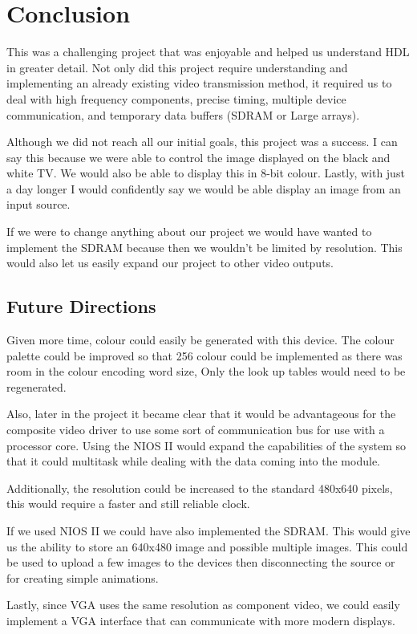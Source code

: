 \section{Conclusion}
This was a challenging project that was enjoyable and helped us understand HDL
in greater detail. Not only did this project require understanding and 
implementing an already existing video transmission method, it required us 
to deal with high frequency components, precise timing, multiple device 
communication, and temporary data buffers (SDRAM or Large arrays).

Although we did not reach all our initial goals, this project was a success. 
I can say this because we were able to control the image displayed on the black
and white TV. We would also be able to display this in 8-bit colour. Lastly, 
with just a day longer I would confidently say we would be able display an 
image from an input source.

If we were to change anything about our project we would have wanted to implement
the SDRAM because then we wouldn't be limited by resolution. This would also
let us easily expand our project to other video outputs.

\newpage

\subsection{Future Directions}

Given more time, colour could easily be generated with this device. The colour
palette could be improved so that 256 colour could be implemented as there was
room in the colour encoding word size, Only the look up tables would need to be
regenerated. 

Also, later in the project it became clear that it would be advantageous for the
composite video driver to use some sort of communication bus for use with a
processor core. Using the NIOS II would expand the capabilities of the system so
that it could multitask while dealing with the data coming into the module.

Additionally, the resolution could be increased to the standard 480x640 pixels,
this would require a faster and still reliable clock.

If we used NIOS II we could have also implemented the SDRAM. This would give us
the ability to store an 640x480 image and possible multiple images. This could 
be used to upload a few images to the devices then disconnecting the source or 
for creating simple animations. 

Lastly, since VGA uses the same resolution as component video, we could easily implement
a VGA interface that can communicate with more modern displays.

